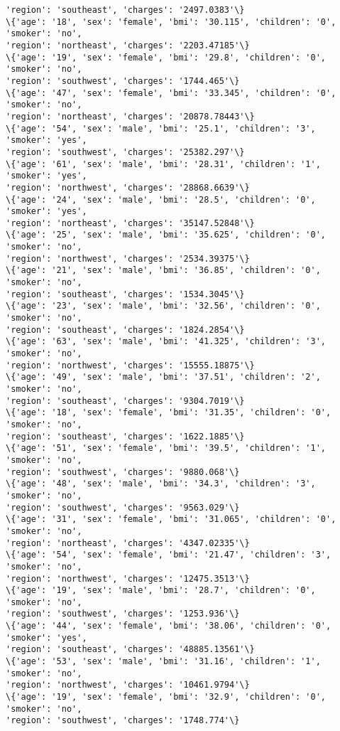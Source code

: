 \documentclass[11pt]{article}
\begin{document}
\begin{Verbatim}[commandchars=\\\{\}]
'region': 'southeast', 'charges': '2497.0383'\}
\{'age': '18', 'sex': 'female', 'bmi': '30.115', 'children': '0', 'smoker': 'no',
'region': 'northeast', 'charges': '2203.47185'\}
\{'age': '19', 'sex': 'female', 'bmi': '29.8', 'children': '0', 'smoker': 'no',
'region': 'southwest', 'charges': '1744.465'\}
\{'age': '47', 'sex': 'female', 'bmi': '33.345', 'children': '0', 'smoker': 'no',
'region': 'northeast', 'charges': '20878.78443'\}
\{'age': '54', 'sex': 'male', 'bmi': '25.1', 'children': '3', 'smoker': 'yes',
'region': 'southwest', 'charges': '25382.297'\}
\{'age': '61', 'sex': 'male', 'bmi': '28.31', 'children': '1', 'smoker': 'yes',
'region': 'northwest', 'charges': '28868.6639'\}
\{'age': '24', 'sex': 'male', 'bmi': '28.5', 'children': '0', 'smoker': 'yes',
'region': 'northeast', 'charges': '35147.52848'\}
\{'age': '25', 'sex': 'male', 'bmi': '35.625', 'children': '0', 'smoker': 'no',
'region': 'northwest', 'charges': '2534.39375'\}
\{'age': '21', 'sex': 'male', 'bmi': '36.85', 'children': '0', 'smoker': 'no',
'region': 'southeast', 'charges': '1534.3045'\}
\{'age': '23', 'sex': 'male', 'bmi': '32.56', 'children': '0', 'smoker': 'no',
'region': 'southeast', 'charges': '1824.2854'\}
\{'age': '63', 'sex': 'male', 'bmi': '41.325', 'children': '3', 'smoker': 'no',
'region': 'northwest', 'charges': '15555.18875'\}
\{'age': '49', 'sex': 'male', 'bmi': '37.51', 'children': '2', 'smoker': 'no',
'region': 'southeast', 'charges': '9304.7019'\}
\{'age': '18', 'sex': 'female', 'bmi': '31.35', 'children': '0', 'smoker': 'no',
'region': 'southeast', 'charges': '1622.1885'\}
\{'age': '51', 'sex': 'female', 'bmi': '39.5', 'children': '1', 'smoker': 'no',
'region': 'southwest', 'charges': '9880.068'\}
\{'age': '48', 'sex': 'male', 'bmi': '34.3', 'children': '3', 'smoker': 'no',
'region': 'southwest', 'charges': '9563.029'\}
\{'age': '31', 'sex': 'female', 'bmi': '31.065', 'children': '0', 'smoker': 'no',
'region': 'northeast', 'charges': '4347.02335'\}
\{'age': '54', 'sex': 'female', 'bmi': '21.47', 'children': '3', 'smoker': 'no',
'region': 'northwest', 'charges': '12475.3513'\}
\{'age': '19', 'sex': 'male', 'bmi': '28.7', 'children': '0', 'smoker': 'no',
'region': 'southwest', 'charges': '1253.936'\}
\{'age': '44', 'sex': 'female', 'bmi': '38.06', 'children': '0', 'smoker': 'yes',
'region': 'southeast', 'charges': '48885.13561'\}
\{'age': '53', 'sex': 'male', 'bmi': '31.16', 'children': '1', 'smoker': 'no',
'region': 'northwest', 'charges': '10461.9794'\}
\{'age': '19', 'sex': 'female', 'bmi': '32.9', 'children': '0', 'smoker': 'no',
'region': 'southwest', 'charges': '1748.774'\}

\end{Verbatim}
\end{document}

